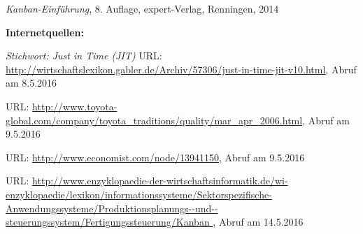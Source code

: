 \begin{thebibliography}{}
	 {\sl Kanban-Einführung}, 8. Auflage, expert-Verlag, Renningen, 2014
	
	
	\textbf{Internetquellen:}

	 {\sl Stichwort: Just in Time (JIT)} URL: \url{http://wirtschaftslexikon.gabler.de/Archiv/57306/just-in-time-jit-v10.html}, Abruf am 8.5.2016

	 URL: \url{	http://www.toyota-global.com/company/toyota_traditions/quality/mar_apr_2006.html}, Abruf am 9.5.2016
	
	 URL: \url{http://www.economist.com/node/13941150}, Abruf am 9.5.2016
	
	
	 URL: \url{	http://www.enzyklopaedie-der-wirtschaftsinformatik.de/wi-enzyklopaedie/lexikon/informationssysteme/Sektorspezifische-Anwendungssysteme/Produktionsplanungs--und--steuerungssystem/Fertigungssteuerung/Kanban
}, Abruf am 14.5.2016

	
	 
  \end{thebibliography}
